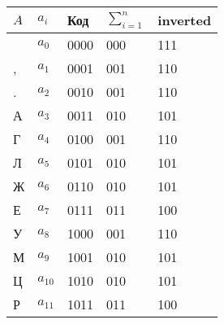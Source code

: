 \begin{tabular}{lllll}
\toprule
$A$ & $a_i$ & Код & $\sum_{i=1}^{n}$ & inverted \\
\midrule
  & $a_{0}$ & 0000 & 000 & 111 \\
, & $a_{1}$ & 0001 & 001 & 110 \\
. & $a_{2}$ & 0010 & 001 & 110 \\
А & $a_{3}$ & 0011 & 010 & 101 \\
Г & $a_{4}$ & 0100 & 001 & 110 \\
Л & $a_{5}$ & 0101 & 010 & 101 \\
Ж & $a_{6}$ & 0110 & 010 & 101 \\
Е & $a_{7}$ & 0111 & 011 & 100 \\
У & $a_{8}$ & 1000 & 001 & 110 \\
М & $a_{9}$ & 1001 & 010 & 101 \\
Ц & $a_{10}$ & 1010 & 010 & 101 \\
Р & $a_{11}$ & 1011 & 011 & 100 \\
\bottomrule
\end{tabular}
